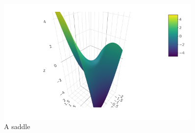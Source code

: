 \documentclass[
  letterpaper,
  DIV=11,
  numbers=noendperiod,
  oneside]{scrreprt}
\begin{document}
\begin{figure}

{\centering \includegraphics[width=0.9\textwidth,height=\textheight]{Differentiation/www/show_poly2_104.png}

}

\caption{\label{fig-saddle2}A saddle}

\end{figure}
\end{document}
